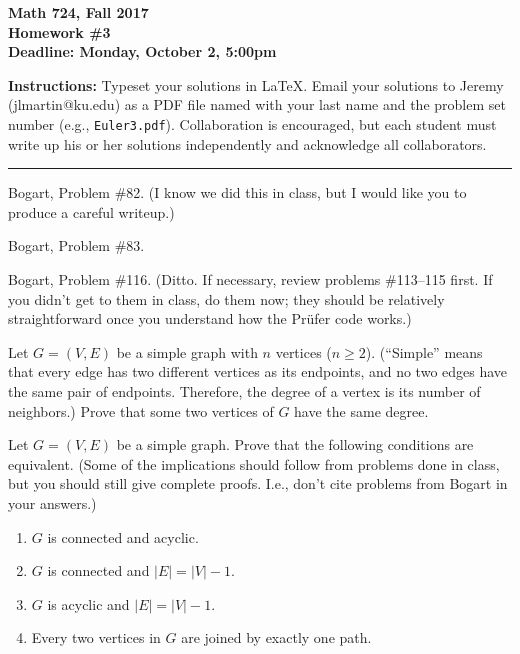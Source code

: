 

\thispagestyle{empty}

\textbf{Math 724, Fall 2017\\
Homework \#3\\
Deadline: Monday, October 2, 5:00pm}

\textbf{Instructions:} Typeset your solutions in LaTeX.  Email your solutions to Jeremy (jlmartin@ku.edu) as a PDF file named with your last name and the problem set number (e.g., {\tt Euler3.pdf}).  Collaboration is encouraged, but each student must write up his or her solutions independently and acknowledge all collaborators.

\medskip\hrule

\prob Bogart, Problem \#82.  (I know we did this in class, but I would like you to produce a careful writeup.)

\vfill\prob   Bogart, Problem \#83.

\vfill\prob   Bogart, Problem \#116.  (Ditto.  If necessary, review problems \#113--115 first.  If you didn't get to them in class, do them now; they should be relatively straightforward once you understand how the Pr\"ufer code works.)

\vfill\prob Let $G=(V,E)$ be a simple graph with $n$ vertices ($n\geq 2$).  (``Simple'' means that every edge has two different vertices as its endpoints, and no two edges have the same pair of endpoints.  Therefore, the degree of a vertex is its number of neighbors.)  Prove that some two vertices of $G$ have the same degree.

\vfill\prob Let $G=(V,E)$ be a simple graph.  Prove that the following conditions are equivalent.  (Some of the implications
should follow from problems done in class, but you should still give complete proofs.  I.e., don't cite problems from Bogart in your answers.)
\begin{enumerate}
\item $G$ is connected and acyclic.
\item $G$ is connected and $|E|=|V|-1$.
\item $G$ is acyclic and $|E|=|V|-1$.
\item Every two vertices in $G$ are joined by exactly one path.
\end{enumerate}

